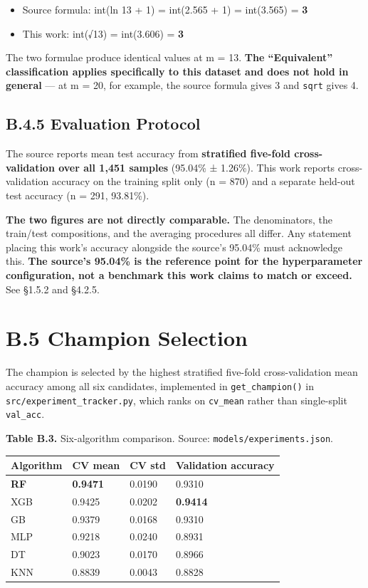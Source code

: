 \begin{itemize}
\tightlist
\item
  Source formula: int(ln 13 + 1) = int(2.565 + 1) = int(3.565) = \textbf{3}
\item
  This work: int(√13) = int(3.606) = \textbf{3}
\end{itemize}

The two formulae produce identical values at m = 13. \textbf{The ``Equivalent'' classification applies specifically to this dataset and does not hold in general} --- at m = 20, for example, the source formula gives 3 and \texttt{\textquotesingle{}sqrt\textquotesingle{}} gives 4.

\hypertarget{b.4.5-evaluation-protocol}{%
\subsection{B.4.5 Evaluation Protocol}\label{b.4.5-evaluation-protocol}}

The source reports mean test accuracy from \textbf{stratified five-fold cross-validation over all 1,451 samples} (95.04\% ± 1.26\%). This work reports cross-validation accuracy on the training split only (n = 870) and a separate held-out test accuracy (n = 291, 93.81\%).

\textbf{The two figures are not directly comparable.} The denominators, the train/test compositions, and the averaging procedures all differ. Any statement placing this work's accuracy alongside the source's 95.04\% must acknowledge this. \textbf{The source's 95.04\% is the reference point for the hyperparameter configuration, not a benchmark this work claims to match or exceed.} See §1.5.2 and §4.2.5.

\hypertarget{b.5-champion-selection}{%
\section{B.5 Champion Selection}\label{b.5-champion-selection}}

The champion is selected by the highest stratified five-fold cross-validation mean accuracy among all six candidates, implemented in \texttt{get\_champion()} in \texttt{src/experiment\_tracker.py}, which ranks on \texttt{cv\_mean} rather than single-split \texttt{val\_acc}.

\textbf{Table B.3.} Six-algorithm comparison. Source: \texttt{models/experiments.json}.

\begin{longtable}[]{@{}llll@{}}
\toprule\noalign{}
Algorithm & CV mean & CV std & Validation accuracy \\
\midrule\noalign{}
\endhead
\bottomrule\noalign{}
\endlastfoot
\textbf{RF} & \textbf{0.9471} & 0.0190 & 0.9310 \\
XGB & 0.9425 & 0.0202 & \textbf{0.9414} \\
GB & 0.9379 & 0.0168 & 0.9310 \\
MLP & 0.9218 & 0.0240 & 0.8931 \\
DT & 0.9023 & 0.0170 & 0.8966 \\
KNN & 0.8839 & 0.0043 & 0.8828 \\
\end{longtable}

